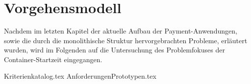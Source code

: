 \chapter{Vorgehensmodell}

Nachdem im letzten Kapitel der aktuelle Aufbau der Payment-Anwendungen, sowie die durch die monolithische Struktur hervorgebrachten Probleme, erläutert wurden, wird im Folgenden auf die Untersuchung des Problemfokuses der Container-Startzeit eingegangen.

{Kriterienkatalog.tex}
{AnforderungenPrototypen.tex}
